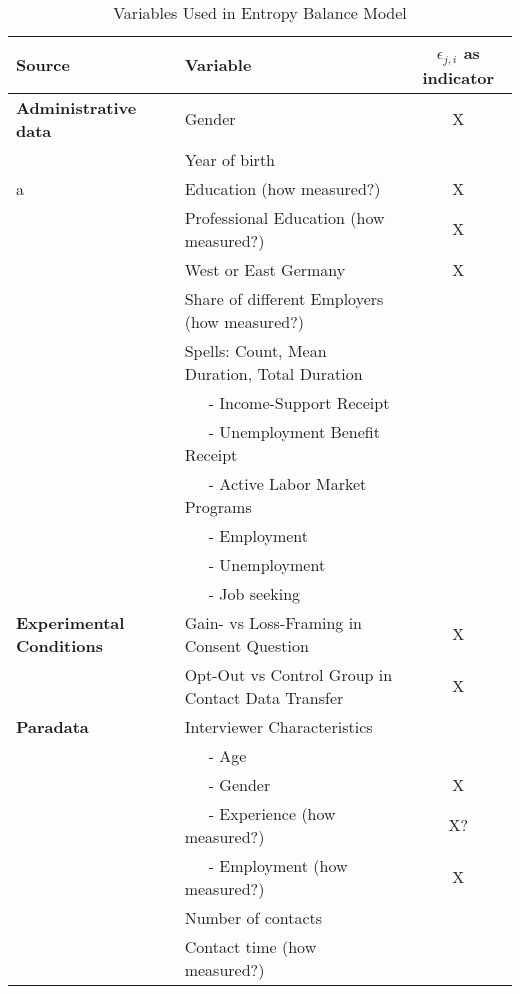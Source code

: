 \renewcommand{\arraystretch}{0.8}
\begin{table*}[h]
 \caption{Variables Used in Entropy Balance Model}\label{tab:covariates}
\begin{tabular}{llc}
  \addlinespace \toprule\addlinespace
  Source & Variable & $\epsilon_{j,i}$ as indicator \\
\midrule
\textbf{Administrative data} &  Gender & X \\ 
							&Year of birth \\ 
a							&Education (how measured?) & X \\ 
							&Professional Education (how measured?) & X \\ 
							&West or East Germany & X\\ 
                            \addlinespace			
						& Share of different Employers  (how measured?)\\ 
							& Spells: Count, Mean Duration, Total Duration\\ 
						&  \ \ \ - Income-Support Receipt   \\ 
							&  \ \ \ - Unemployment Benefit Receipt \\ 
							& \ \ \ - Active Labor Market Programs \\ 
							&\ \ \  - Employment\\ 
							& \ \ \ - Unemployment \\ 
							& \ \ \ - Job seeking \\ 
 \addlinespace
\textbf{Experimental Conditions} & Gain- vs Loss-Framing in Consent Question & X \\
& Opt-Out vs Control Group in Contact Data Transfer & X \\ 
 \addlinespace
\textbf{Paradata}  			& Interviewer Characteristics \\ 
							& \ \ \ - Age \\ 
							& \ \ \ - Gender & X \\ 
							& \ \ \ - Experience (how measured?) & X? \\
                            & \ \ \ - Employment (how measured?) & X \\ 
\addlinespace
					& Number of contacts \\ 
					& Contact time (how measured?) \\ 
 \bottomrule
 \end{tabular}
\end{table*}